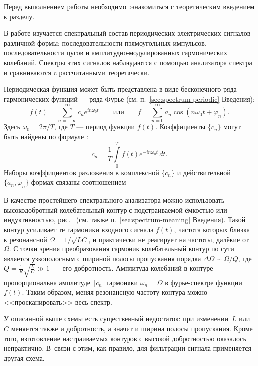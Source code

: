 

Перед выполнением работы необходимо ознакомиться с теоретическим введением
к разделу.

В работе изучается спектральный состав периодических электрических сигналов
различной формы: последовательности прямоугольных импульсов, последовательности
цугов и амплитудно-модулированных гармонических колебаний. Спектры этих сигналов
наблюдаются с помощью анализатора спектра и сравниваются c рассчитанными
теоретически.

Периодическая функция может быть представлена в виде бесконечного ряда
гармонических функций --- ряда Фурье (см. п.~\ref{sec:spectrum-periodic}
Введения):
\[
f(t) = \sum_{n=-\infty}^{\infty} c_n e^{in\omega_0 t}\qquad\text{или}\qquad
f=\sum_{n=0}^{\infty} a_n \cos (n\omega_0 t + \varphi_n).
\]
Здесь $\omega_0 = 2\pi/T$, где $T$ --- период функции $f(t)$.
Коэффициенты $\{c_n\}$ могут быть найдены по формуле
:
\[
    c_n=\frac{1}{T}\int\limits_{0}^{T} f(t)e^{-in\omega_0 t}\,dt.
\]
Наборы коэффициентов разложения в комплексной $\{c_n\}$ и действительной
$\{a_n,\varphi_n\}$ формах связаны соотношением .


В качестве простейшего спектрального анализатора можно использовать
высокодобротный колебательный контур с подстраиваемой ёмкостью или
индуктивностью, рис.~
(см. также п.~\ref{sec:spectrum-meaning} Введения).
Такой контур усиливает те гармоники входного сигнала $f(t)$, частота которых близка к резонансной
$\Omega = 1/\sqrt{LC}$, и практически не реагирует на частоты,
далёкие от $\Omega$. С точки зрения преобразования гармоник колебательный контур
по сути является узкополосным  с шириной полосы
пропускания порядка $\Delta \Omega \sim \Omega / Q$, где $Q =
\frac{1}{R}\sqrt{\frac{L}{C}} \gg 1$~--- его добротность. Амплитуда колебаний
в контуре пропорциональна амплитуде~$|c_n|$ гармоники $\omega_n=\Omega$
в фурье-спектре функции $f(t)$. Таким образом, меняя резонансную частоту контура
можно <<просканировать>> весь спектр.

У описанной выше схемы есть существенный недостаток: при изменении~$L$ или~$C$
меняется также и добротность, а значит и ширина полосы пропускания.
Кроме того, изготовление настраиваемых контуров с высокой добротностью
оказалось непрактично. В~связи с этим, как правило, для фильтрации сигнала
применяется другая схема.

